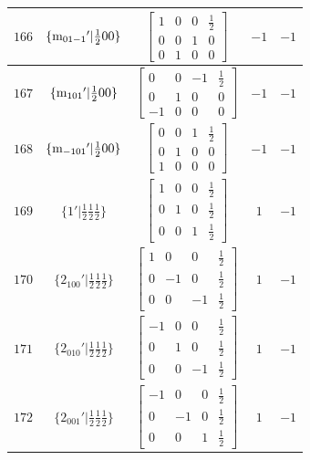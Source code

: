 \documentclass[fleqn,8pt]{jsarticle}
\begin{document}
\begin{longtable}{ccccc}
$ 166 $ & $ \{{\rm m}_{01-1}{}'|\frac{1}{2} 0 0\} $ & $ \begin{bmatrix} 1 & 0 & 0 & \frac{1}{2} \\ 0 & 0 & 1 & 0 \\ 0 & 1 & 0 & 0 \end{bmatrix} $ & $ -1 $ & $ -1 $ \\ \hline
$ 167 $ & $ \{{\rm m}_{101}{}'|\frac{1}{2} 0 0\} $ & $ \begin{bmatrix} 0 & 0 & -1 & \frac{1}{2} \\ 0 & 1 & 0 & 0 \\ -1 & 0 & 0 & 0 \end{bmatrix} $ & $ -1 $ & $ -1 $ \\ \hline
$ 168 $ & $ \{{\rm m}_{-101}{}'|\frac{1}{2} 0 0\} $ & $ \begin{bmatrix} 0 & 0 & 1 & \frac{1}{2} \\ 0 & 1 & 0 & 0 \\ 1 & 0 & 0 & 0 \end{bmatrix} $ & $ -1 $ & $ -1 $ \\ \hline
$ 169 $ & $ \{1{}'|\frac{1}{2} \frac{1}{2} \frac{1}{2}\} $ & $ \begin{bmatrix} 1 & 0 & 0 & \frac{1}{2} \\ 0 & 1 & 0 & \frac{1}{2} \\ 0 & 0 & 1 & \frac{1}{2} \end{bmatrix} $ & $ 1 $ & $ -1 $ \\ \hline
$ 170 $ & $ \{2{}_{100}{}'|\frac{1}{2} \frac{1}{2} \frac{1}{2}\} $ & $ \begin{bmatrix} 1 & 0 & 0 & \frac{1}{2} \\ 0 & -1 & 0 & \frac{1}{2} \\ 0 & 0 & -1 & \frac{1}{2} \end{bmatrix} $ & $ 1 $ & $ -1 $ \\ \hline
$ 171 $ & $ \{2{}_{010}{}'|\frac{1}{2} \frac{1}{2} \frac{1}{2}\} $ & $ \begin{bmatrix} -1 & 0 & 0 & \frac{1}{2} \\ 0 & 1 & 0 & \frac{1}{2} \\ 0 & 0 & -1 & \frac{1}{2} \end{bmatrix} $ & $ 1 $ & $ -1 $ \\ \hline
$ 172 $ & $ \{2{}_{001}{}'|\frac{1}{2} \frac{1}{2} \frac{1}{2}\} $ & $ \begin{bmatrix} -1 & 0 & 0 & \frac{1}{2} \\ 0 & -1 & 0 & \frac{1}{2} \\ 0 & 0 & 1 & \frac{1}{2} \end{bmatrix} $ & $ 1 $ & $ -1 $ \\ \hline

\end{longtable}
\end{document}
